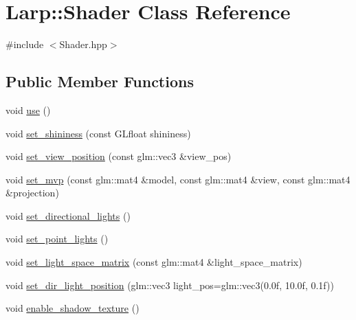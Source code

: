 \hypertarget{classLarp_1_1Shader}{}\section{Larp\+:\+:Shader Class Reference}
\label{classLarp_1_1Shader}


{\ttfamily \#include $<$Shader.\+hpp$>$}

\subsection*{Public Member Functions}
\begin{DoxyCompactItemize}
\item 
void \hyperlink{classLarp_1_1Shader_a781750e2455007153ea226c0928bc24a}{use} ()
\item 
void \hyperlink{classLarp_1_1Shader_ac86be28506c5c4c9da5186aa664e21e0}{set\+\_\+shininess} (const G\+Lfloat shininess)
\item 
void \hyperlink{classLarp_1_1Shader_a50e11c955b724208e80923592a73578d}{set\+\_\+view\+\_\+position} (const glm\+::vec3 \&view\+\_\+pos)
\item 
void \hyperlink{classLarp_1_1Shader_abb398986a0f14e38aab17605ceec5a21}{set\+\_\+mvp} (const glm\+::mat4 \&model, const glm\+::mat4 \&view, const glm\+::mat4 \&projection)
\item 
void \hyperlink{classLarp_1_1Shader_a9059d7e6cd40b9e3ba9cd944e76d92cc}{set\+\_\+directional\+\_\+lights} ()
\item 
void \hyperlink{classLarp_1_1Shader_aa2897e4d25995a05081d258780fa4ced}{set\+\_\+point\+\_\+lights} ()
\item 
void \hyperlink{classLarp_1_1Shader_a248f491bd88a8e675988e9c97d2ab2c4}{set\+\_\+light\+\_\+space\+\_\+matrix} (const glm\+::mat4 \&light\+\_\+space\+\_\+matrix)
\item 
void \hyperlink{classLarp_1_1Shader_abbe0c7e5cb2384c1469ad83395265641}{set\+\_\+dir\+\_\+light\+\_\+position} (glm\+::vec3 light\+\_\+pos=glm\+::vec3(0.\+0f, 10.\+0f, 0.\+1f))
\item 
void \hyperlink{classLarp_1_1Shader_a2945f4259d55a7a41f49d7a76cb87a1e}{enable\+\_\+shadow\+\_\+texture} ()
\end{DoxyCompactItemize}
